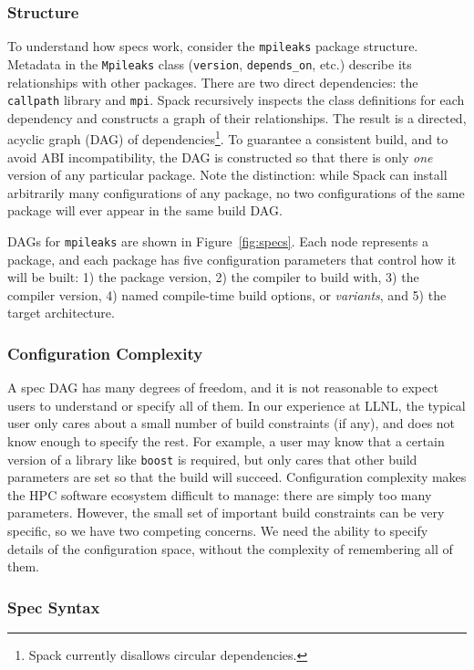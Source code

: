 \subsubsection{Structure}
To understand how specs work, consider the {\tt mpileaks} package structure.
Metadata in the {\tt Mpileaks} class ({\tt version}, {\tt depends\_on}, etc.) describe
its relationships with other packages.  There are two direct dependencies:
the {\tt callpath} library and {\tt mpi}.  Spack recursively inspects the class definitions
for each dependency and constructs a graph of their relationships.  The result
is a directed, acyclic graph (DAG) of dependencies\footnote{Spack currently disallows
circular dependencies.}.
%
To guarantee a consistent build, and to avoid ABI incompatibility, the DAG
is constructed so that there is only {\it one} version of any particular package.  Note
the distinction: while Spack can install arbitrarily many configurations of any package,
no two configurations of the same package will ever appear in the same build DAG.

DAGs for {\tt mpileaks} are shown in Figure~\ref{fig:specs}.
Each node represents a package, and each package has five configuration parameters that control
how it will be built: 1) the package version, 2) the compiler to
build with, 3) the compiler version, 4) named compile-time build options, or {\it variants},
and 5) the target architecture.


\subsubsection{Configuration Complexity}
A spec DAG has many degrees of freedom, and it is not reasonable to expect users to
understand or specify all of them.  In our experience at LLNL, the typical user
only cares about a small number of build constraints (if any), and does not know enough to
specify the rest. For example, a user may know that a certain version of a library like
{\tt boost} is required, but only cares that other build parameters are set so that
the build will succeed.
%
Configuration complexity makes the HPC software ecosystem difficult to manage: there are
simply too many parameters. However, the small set of important build constraints can be
very specific, so we have two competing concerns.  We need the ability to specify details
of the configuration space, without the complexity of remembering all of them.

\subsubsection{Spec Syntax}\label{sec:syntax}

